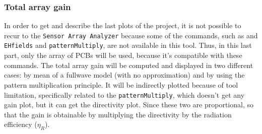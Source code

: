 \documentclass[12pt,a4paper]{article}
\begin{document}
{\subsubsection*{\selectfont\color{Turquoise}Total array gain}
In order to get and describe the last plots of the project, it is not possible to recur to the \texttt{\color{Mahogany}Sensor Array Analyzer} because some of the commands, such as  and \texttt{\color{Turquoise}EHfields} and \texttt{\color{Turquoise}patternMultiply}, are not available in this tool. Thus, in this last part, only the array of PCBs will be used, because it's compatible with these commands. The total array gain will be computed and displayed in two different cases: by mean of a fullwave model (with no approximation) and by using the pattern multiplication principle. It will be indirectly plotted because of tool limitation, specifically related to the \texttt{\color{Turquoise}patternMultiply}, which doesn't get any gain plot, but it can get the directivity plot. Since these two are proportional, so that the gain is obtainable by multiplying the directivity by the radiation efficiency ($\eta_R$). 
	
	
	
	
	
	
	
	
	
	
	
	
	
	
	
}
\end{document}
